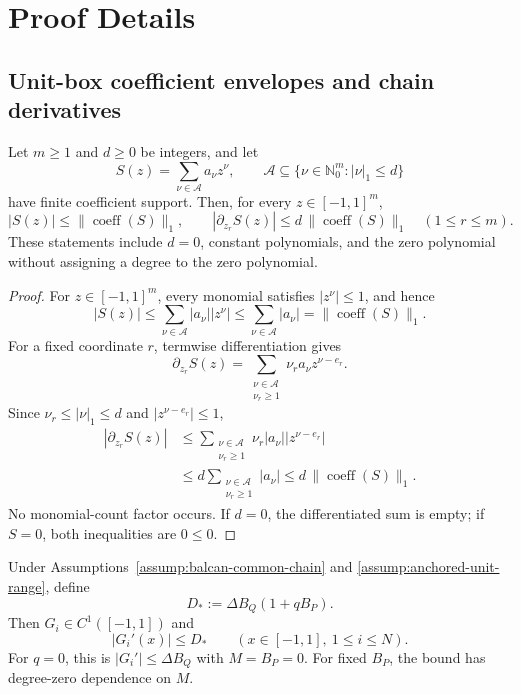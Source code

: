 \appendix

\section{Proof Details}

\subsection{Unit-box coefficient envelopes and chain derivatives}
\label{app:coefficient-envelope}

\begin{lemma}
\label{lem:unit-box-envelope}
Let $m\geq1$ and $d\geq0$ be integers, and let
\[
S(z)=\sum_{\nu\in\mathcal A}a_\nu z^\nu,
\qquad
\mathcal A\subseteq
\{\nu\in\mathbb N_0^m:|\nu|_1\leq d\}
\]
have finite coefficient support.  Then, for every $z\in[-1,1]^m$,
\[
|S(z)|\leq\|\operatorname{coeff}(S)\|_1,
\qquad
|\partial_{z_r}S(z)|
\leq d\,\|\operatorname{coeff}(S)\|_1
\quad(1\leq r\leq m).
\]
These statements include $d=0$, constant polynomials, and the zero
polynomial without assigning a degree to the zero polynomial.
\end{lemma}

\begin{proof}
For $z\in[-1,1]^m$, every monomial satisfies $|z^\nu|\leq1$, and hence
\[
|S(z)|
\leq\sum_{\nu\in\mathcal A}|a_\nu||z^\nu|
\leq\sum_{\nu\in\mathcal A}|a_\nu|
=\|\operatorname{coeff}(S)\|_1.
\]
For a fixed coordinate $r$, termwise differentiation gives
\[
\partial_{z_r}S(z)
=\sum_{\substack{\nu\in\mathcal A\\\nu_r\geq1}}
 \nu_r a_\nu z^{\nu-e_r}.
\]
Since $\nu_r\leq|\nu|_1\leq d$ and
$|z^{\nu-e_r}|\leq1$,
\[
\begin{aligned}
|\partial_{z_r}S(z)|
&\leq
\sum_{\substack{\nu\in\mathcal A\\\nu_r\geq1}}
 \nu_r|a_\nu||z^{\nu-e_r}|\\
&\leq d
\sum_{\substack{\nu\in\mathcal A\\\nu_r\geq1}}|a_\nu|
\leq d\,\|\operatorname{coeff}(S)\|_1.
\end{aligned}
\]
No monomial-count factor occurs.  If $d=0$, the differentiated sum is empty;
if $S=0$, both inequalities are $0\leq0$.
\end{proof}

\begin{proposition}
\label{prop:coordinate-envelope}
Under Assumptions~\ref{assump:balcan-common-chain} and
\ref{assump:anchored-unit-range}, define
\[
D_*:=\Delta B_Q(1+qB_P).
\]
Then $G_i\in C^1([-1,1])$ and
\[
|G_i'(x)|\leq D_*
\qquad
(x\in[-1,1],\ 1\leq i\leq N).
\]
For $q=0$, this is $|G_i'|\leq\Delta B_Q$ with $M=B_P=0$.
For fixed $B_P$, the bound has degree-zero dependence on $M$.
\end{proposition}

